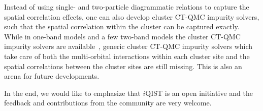 Instead of using single- and two-particle diagrammatic relations to capture the spatial correlation effects, one can also develop cluster CT-QMC impurity solvers, such that the spatial correlation within the cluster can be captured exactly. While in one-band models and a few two-band models the cluster CT-QMC impurity solvers are available~\cite{RevModPhys.77.1027,RevModPhys.78.865,PhysRevB.88.041103,PhysRevB.88.245110,PhysRevB.89.195146}, generic cluster CT-QMC impurity solvers which take care of both the multi-orbital interactions within each cluster site and the spatial correlations between the cluster sites are still missing. This is also an arena for future developments.


In the end, we would like to emphasize that $i$QIST is an open initiative and the feedback and contributions from the community are very welcome.

